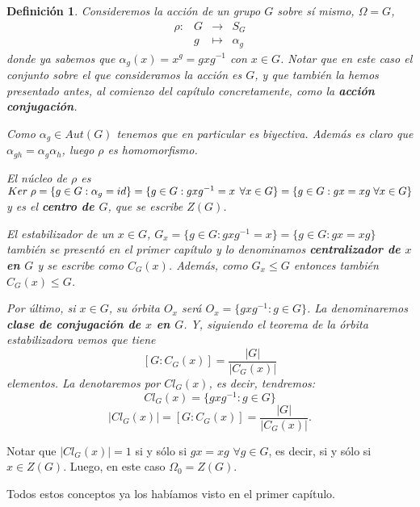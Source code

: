 \documentclass[12pt]{article}
\newtheorem{definition}[theorem]{Definición}
\begin{document}
\begin{definition}\label{eq:accConj} Consideremos la acción de un grupo $G$ sobre sí mismo, $\Omega = G$, $$\begin{array}{rccl}
\rho\colon &G& \longrightarrow &S_G\\
&g& \longmapsto &\alpha_{g}
\end{array}
$$
donde ya sabemos que $\alpha_{g}(x) = x^{g}=gxg^{-1}$ con $x \in G$. Notar que en este caso el conjunto sobre el que consideramos la acción es $G$, y que también la hemos presentado antes, al comienzo del capítulo concretamente, como la \textbf{acción conjugación}.

Como $\alpha_{g} \in Aut(G)$ tenemos que en particular es biyectiva. Además es claro que $\alpha_{gh}=\alpha_{g}\alpha_{h}$, luego $\rho$ es homomorfismo.

El núcleo de $\rho$ es $Ker \hspace{0.1cm} \rho = \lbrace g \in G: \alpha_{g} = id \rbrace = \lbrace g \in G: gxg^{-1} = x \hspace{0.15cm} \forall x \in G \rbrace =  \lbrace g \in G: gx = xg \hspace{0.1cm} \forall x \in G \rbrace$ y es el \textbf{centro de $G$}, que se escribe \textbf{$Z(G)$}.

El estabilizador de un $x \in G$, $G_{x}= \lbrace g \in G: gxg^{-1} = x \rbrace = \lbrace g \in G: gx=xg \rbrace$ también se presentó en el primer capítulo y lo denominamos \textbf{centralizador de $x$ en $G$} y se escribe como \textbf{$C_{G}(x)$}. Además, como $G_{x} \leq G$ entonces también $C_{G}(x) \leq G$.

Por último, si $x \in G$, su órbita $O_{x}$ será $O_{x} = \lbrace gxg^{-1}:g \in G \rbrace$. La denominaremos \textbf{clase de conjugación de $x$ en $G$}. Y, siguiendo el teorema de la órbita estabilizadora vemos que tiene $$[G:C_{G}(x)] = \dfrac{|G|}{|C_{G}(x)|}$$ elementos. La denotaremos por $Cl_{G}(x)$, es decir, tendremos: $$Cl_{G}(x) = \lbrace gxg^{-1} : g \in G \rbrace$$ $$|Cl_{G}(x)| = [G :C_G(x)] = \dfrac{|G|}{|C_G(x)|}.$$
\end{definition}

Notar que $|Cl_G(x) | = 1$ si y sólo si $gx = xg$ $\forall g \in G$, es decir, si y sólo si $x \in Z(G)$. Luego, en este caso $\Omega_0 = Z(G).$

Todos estos conceptos ya los habíamos visto en el primer capítulo.
\end{document}
